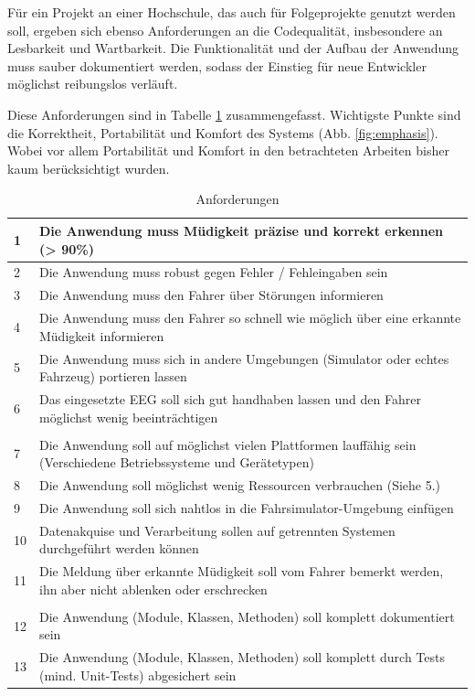 Für ein Projekt an einer Hochschule, das auch für Folgeprojekte genutzt werden soll, ergeben sich ebenso Anforderungen an die Codequalität, insbesondere an Lesbarkeit und Wartbarkeit. Die Funktionalität und der Aufbau der Anwendung muss sauber dokumentiert werden, sodass der Einstieg für neue Entwickler möglichst reibungslos verläuft.

Diese Anforderungen sind in Tabelle \ref{tab:requirements} zusammengefasst. Wichtigste Punkte sind die Korrektheit, Portabilität und Komfort des Systems (Abb. \ref{fig:emphasis}). Wobei vor allem Portabilität und Komfort in den betrachteten Arbeiten bisher kaum berücksichtigt wurden.

\begin{table}[t]
 \caption{Anforderungen}
 \renewcommand{\arraystretch}{2}
 \begin{tabularx}{\textwidth}{lX}
  1 & Die Anwendung muss Müdigkeit präzise und korrekt erkennen (> 90\%) \\ \hline
  2 & Die Anwendung muss robust gegen Fehler / Fehleingaben sein \\ \hline 
  3 & Die Anwendung muss den Fahrer über Störungen informieren \\ \hline
  4 & Die Anwendung muss den Fahrer so schnell wie möglich über eine erkannte Müdigkeit informieren \\ \hline
  5 & Die Anwendung muss sich in andere Umgebungen (Simulator oder echtes Fahrzeug) portieren lassen \\ \hline 
  6 & Das eingesetzte EEG soll sich gut handhaben lassen und den Fahrer möglichst wenig beeinträchtigen \\ \hline
  \\
  7 & Die Anwendung soll auf möglichst vielen Plattformen lauffähig sein (Verschiedene Betriebssysteme und Gerätetypen) \\ \hline
  8 & Die Anwendung soll möglichst wenig Ressourcen verbrauchen (Siehe 5.) \\ \hline
  9 & Die Anwendung soll sich nahtlos in die Fahrsimulator-Umgebung einfügen \\ \hline
  10 & Datenakquise und Verarbeitung sollen auf getrennten Systemen durchgeführt werden können \\ \hline
  11 & Die Meldung über erkannte Müdigkeit soll vom Fahrer bemerkt werden, ihn aber nicht ablenken oder erschrecken \\ \hline
  \\
  12 & Die Anwendung (Module, Klassen, Methoden) soll komplett dokumentiert sein \\ \hline 
  13 & Die Anwendung (Module, Klassen, Methoden) soll komplett durch Tests (mind. Unit-Tests) abgesichert sein \\ \hline
 \end{tabularx}
 \label{tab:requirements}
\end{table}

